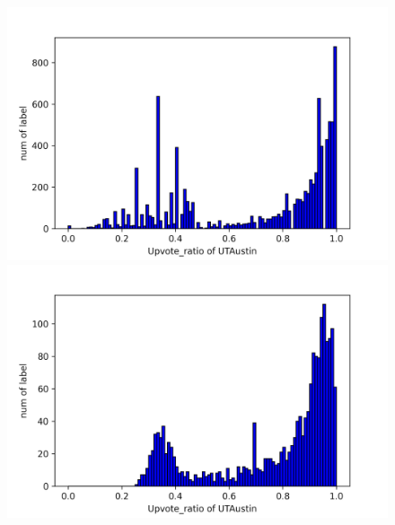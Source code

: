 \documentclass[11pt,a4paper]{article}
\begin{document}
    \begin{figure}
        \begin{minipage}{0.5\textwidth}
            \includegraphics[width=\textwidth]{utaustin_task2true_nonsmooth.png}
        \end{minipage}
        \begin{minipage}{0.5\textwidth}
            \includegraphics[width=\textwidth]{utaustin_task2pred_nonsmooth.png}
        \end{minipage}


\end{figure}
\end{document}
